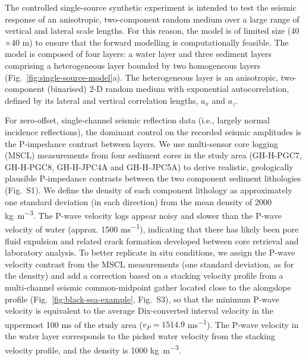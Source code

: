 \documentclass[se,manuscript]{copernicus}
\begin{document}
The controlled single-source synthetic experiment is intended to test the seismic response of an anisotropic, two-component random medium over a large range of vertical and lateral scale lengths.
For this reason, the model is of limited size (40$\times$40 \unit{m}) to ensure that the forward modelling is computationally feasible.
The model is composed of four layers: a water layer and three sediment layers comprising a heterogeneous layer bounded by two homogeneous layers (Fig.~\ref{fig:single-source-model}a).
The heterogeneous layer is an anisotropic, two-component (binarised) 2-D random medium with exponential autocorrelation, defined by its lateral and vertical correlation lengths, $a_x$ and $a_z$.

For zero-offset, single-channel seismic reflection data (i.e., largely normal incidence reflections), the dominant control on the recorded seismic amplitudes is the P-impedance contrast between layers.
We use multi-sensor core logging (MSCL) measurements from four sediment cores in the study area ({GH-H-PGC7}, {GH-H-PGC8}, {GH-H-JPC4A} and {GH-H-JPC5A}) to derive realistic, geologically plausible P-impedance contrasts between the two component sediment lithologies (Fig.~S1).
We define the density of each component lithology as approximately one standard deviation (in each direction) from the mean density of 2000 \unit{kg m^{-3}}.
The P-wave velocity logs appear noisy and slower than the P-wave velocity of water (approx. 1500 \unit{ms^{-1}}), indicating that there has likely been pore fluid expulsion and related crack formation developed between core retrieval and laboratory analysis.
To better replicate in situ conditions, we assign the P-wave velocity contrast from the MSCL measurements (one standard deviation, as for the density) and add a correction based on a stacking velocity profile from a multi-channel seismic common-midpoint gather located close to the alongslope profile (Fig.~\ref{fig:black-sea-example}, Fig.~S3), so that the minimum P-wave velocity is equivalent to the average Dix-converted interval velocity in the uppermost 100 \unit{ms} of the study area ($v_P=1514.9$ \unit{ms^{-1}}).
The P-wave velocity in the water layer corresponds to the picked water velocity from the stacking velocity profile, and the density is 1000 \unit{kg m^{-3}}.
\end{document}
